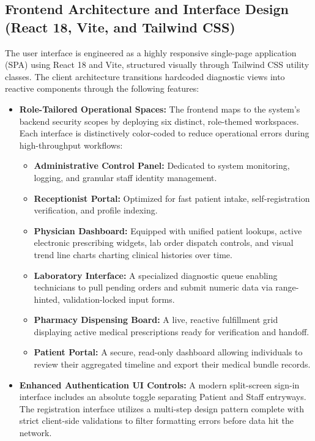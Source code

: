 \documentclass[12pt, a4paper]{report}
\numberwithin{equation}{chapter}
\begin{document}
\subsection{Frontend Architecture and Interface Design (React 18, Vite, and Tailwind CSS)}
The user interface is engineered as a highly responsive single-page application (SPA) using React 18 and Vite, structured visually through Tailwind CSS utility classes. The client architecture transitions hardcoded diagnostic views into reactive components through the following features:
\begin{itemize}
    \item \textbf{Role-Tailored Operational Spaces:} The frontend maps to the system's backend security scopes by deploying six distinct, role-themed workspaces. Each interface is distinctively color-coded to reduce operational errors during high-throughput workflows:
    \begin{itemize}
        \item \textbf{Administrative Control Panel:} Dedicated to system monitoring, logging, and granular staff identity management.
        \item \textbf{Receptionist Portal:} Optimized for fast patient intake, self-registration verification, and profile indexing.
        \item \textbf{Physician Dashboard:} Equipped with unified patient lookups, active electronic prescribing widgets, lab order dispatch controls, and visual trend line charts charting clinical histories over time.
        \item \textbf{Laboratory Interface:} A specialized diagnostic queue enabling technicians to pull pending orders and submit numeric data via range-hinted, validation-locked input forms.
        \item \textbf{Pharmacy Dispensing Board:} A live, reactive fulfillment grid displaying active medical prescriptions ready for verification and handoff.
        \item \textbf{Patient Portal:} A secure, read-only dashboard allowing individuals to review their aggregated timeline and export their medical bundle records.
    \end{itemize}
    \item \textbf{Enhanced Authentication UI Controls:} A modern split-screen sign-in interface includes an absolute toggle separating Patient and Staff entryways. The registration interface utilizes a multi-step design pattern complete with strict client-side validations to filter formatting errors before data hit the network.

\end{itemize}
\end{document}
